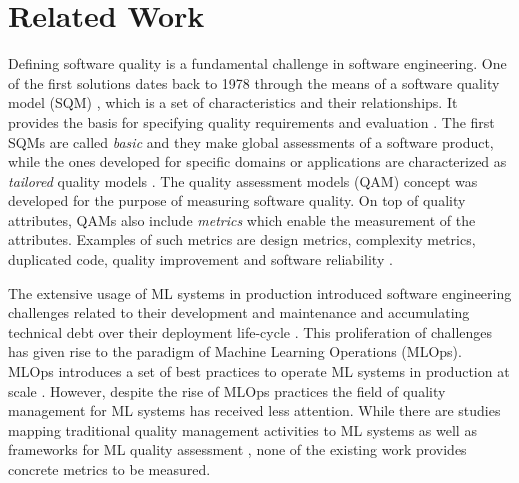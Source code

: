 \section{Related Work}
Defining software quality is a fundamental challenge in software engineering. One of the first solutions dates back to 1978 through the means of a software quality model (SQM) \cite{McCall}, which is a set of characteristics and their relationships. It provides the basis for specifying quality requirements and evaluation \cite{ISO9126}. The first SQMs \cite{Dromey,Boehm,Grady} are called \textit{basic} and they make global assessments of a software product, while the ones developed for specific domains or applications are characterized as \textit{tailored} quality models \cite{Miguel}.
The quality assessment models (QAM) concept was developed for the purpose of measuring software quality. On top of quality attributes, QAMs also include \textit{metrics} which enable the measurement of the attributes. Examples of such metrics are design metrics, complexity metrics, duplicated code, quality improvement and software reliability \cite{models-measurement-QA,SQAM-systematic-mapping,systematic-open-source-SQAM}. %

The extensive usage of ML systems in production introduced software engineering challenges related to their development and maintenance \cite{large-scale-ML, challenges-in-deploying-ML, a-software-engineering-perspective} and accumulating technical debt over their deployment life-cycle \cite{wamlm2023, sculley2015hidden}. This proliferation of challenges has given rise to the paradigm of Machine Learning Operations (MLOps). 
MLOps introduces a set of best practices to operate ML systems in production at scale \cite{MLOps-Overview,symeonidis2022mlops}. However, despite the rise of MLOps practices the field of quality management for ML systems has received less attention. While there are studies mapping traditional quality management activities to ML systems \cite{quality-management} as well as frameworks for ML quality assessment \cite{towards-guidelines-for-assessing,crisp-ML,quality-assurance-challenges}, none of the existing work provides concrete metrics to be measured.


